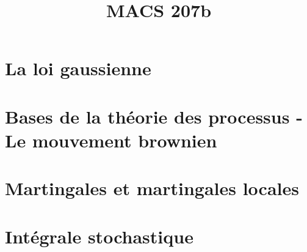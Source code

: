 \documentclass[a4paper,10pt]{article}
\title{\vspace{-1.2cm} \textbf{MACS 207b}}
\begin{document}
\maketitle

\vspace{-1.5cm}

\section{La loi gaussienne}
	

\section{Bases de la théorie des processus - Le mouvement brownien}
	

\section{Martingales et martingales locales}
	

\section{Intégrale stochastique}
	
\end{document}
